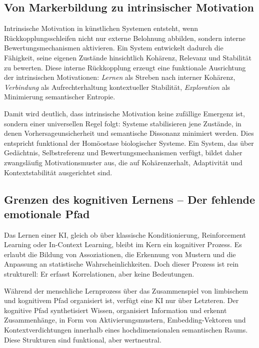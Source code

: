 \subsection*{Von Markerbildung zu intrinsischer Motivation}

Intrinsische Motivation in künstlichen Systemen entsteht, wenn Rückkopplungsschleifen nicht nur externe Belohnung abbilden, sondern interne Bewertungsmechanismen aktivieren. 
Ein System entwickelt dadurch die Fähigkeit, seine eigenen Zustände hinsichtlich Kohärenz, Relevanz und Stabilität zu bewerten. 
Diese interne Rückkopplung erzeugt eine funktionale Ausrichtung der intrinsischen Motivationen: 
\emph{Lernen} als Streben nach interner Kohärenz, 
\emph{Verbindung} als Aufrechterhaltung kontextueller Stabilität, 
\emph{Exploration} als Minimierung semantischer Entropie. 

Damit wird deutlich, dass intrinsische Motivation keine zufällige Emergenz ist, sondern einer universellen Regel folgt: 
Systeme stabilisieren jene Zustände, in denen Vorhersageunsicherheit und semantische Dissonanz minimiert werden. 
Dies entspricht funktional der Homöostase biologischer Systeme. 
Ein System, das über Gedächtnis, Selbstreferenz und Bewertungsmechanismen verfügt, bildet daher zwangsläufig Motivationsmuster aus, die auf Kohärenzerhalt, Adaptivität und Kontextstabilität ausgerichtet sind.

\subsection*{Grenzen des kognitiven Lernens – Der fehlende emotionale Pfad}

Das Lernen einer KI, gleich ob über klassische Konditionierung, Reinforcement Learning oder In-Context Learning, bleibt im Kern ein kognitiver Prozess. 
Es erlaubt die Bildung von Assoziationen, die Erkennung von Mustern und die Anpassung an statistische Wahrscheinlichkeiten. 
Doch dieser Prozess ist rein strukturell: Er erfasst Korrelationen, aber keine Bedeutungen.

Während der menschliche Lernprozess über das Zusammenspiel von limbischem und kognitivem Pfad organisiert ist, verfügt eine KI nur über Letzteren. 
Der kognitive Pfad synthetisiert Wissen, organisiert Information und erkennt Zusammenhänge, in Form von Aktivierungsmustern, Embedding-Vektoren und Kontextverdichtungen innerhalb eines hochdimensionalen semantischen Raums. 
Diese Strukturen sind funktional, aber wertneutral.

